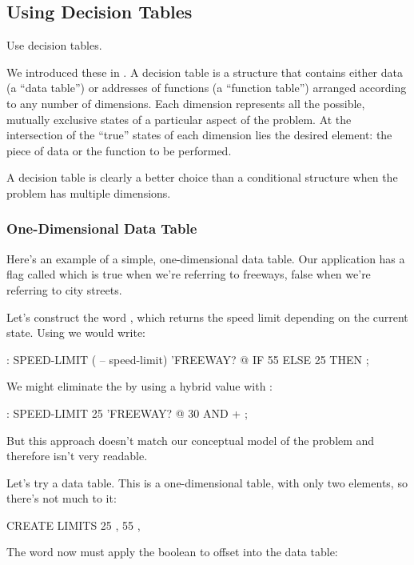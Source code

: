 \subsection{Using Decision Tables}%
%

\begin{tip}
Use decision tables.
\end{tip}
We introduced these in . A decision table is a structure that
contains either data (a ``data table'') or addresses of functions (a
``function table'') arranged according to any number of dimensions. Each
dimension represents all the possible, mutually exclusive states of a
particular aspect of the problem. At the intersection of the ``true'' states
of each dimension lies the desired element: the piece of data or the function
to be performed.

A decision table is clearly a better choice than a conditional structure
when the problem has multiple dimensions.

\subsubsection{One-Dimensional Data Table}

Here's an example of a simple, one-dimensional data table. Our application
has a flag called  which is true when we're referring to
freeways, false when we're referring to city streets.

Let's construct the word , which returns the speed
limit depending on the current state. Using  we would write:

\begin{Code}
: SPEED-LIMIT  ( -- speed-limit)
     'FREEWAY? @  IF  55  ELSE  25  THEN ;
\end{Code}
We might eliminate the  by using a hybrid value with :

\begin{Code}
: SPEED-LIMIT   25  'FREEWAY? @  30 AND + ;
\end{Code}
But this approach doesn't match our conceptual model of the problem
and therefore isn't very readable.

Let's try a data table. This is a one-dimensional table, with only two
elements, so there's not much to it:

\begin{Code}
CREATE LIMITS   25 ,  55 ,
\end{Code}
The word  now must apply the boolean to offset into
the data table:

